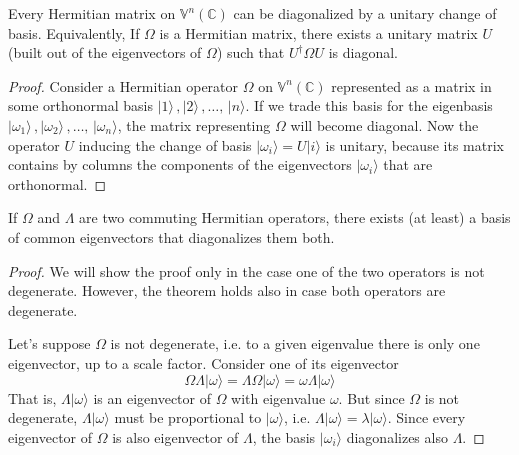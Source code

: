 \documentclass[11pt,fleqn]{book} %
\newcommand{\ket}[1]{| #1\rangle}
\begin{document}
\begin{theorem}
    Every Hermitian matrix on $\mathbb{V}^n(\mathbb{C})$ can be diagonalized by a unitary change of basis. Equivalently,
    If $\Omega$ is a Hermitian matrix, there exists a unitary matrix $U$ (built out of the eigenvectors of $\Omega$) such that 
    $U^\dagger\Omega U$ is diagonal.
\end{theorem}
\begin{proof}
    Consider a Hermitian operator $\Omega$ on $\mathbb{V}^n(\mathbb{C})$ represented as a matrix in some
    orthonormal basis $\ket{1}\,,\ket{2}\,,\dots,\,\ket{n}$. If we trade this basis for the eigenbasis
    $\ket{\omega_1}\,,\ket{\omega_2}\,,\dots,\,\ket{\omega_n}$, the matrix representing $\Omega$ will become diagonal. 
    Now the operator $U$ inducing the change of basis $\ket{\omega_i}=U\ket{i}$ is unitary, because its matrix contains by
    columns the components of the eigenvectors $\ket{\omega_i}$ that are orthonormal.
\end{proof}
\begin{theorem}
    If $\Omega$ and $\Lambda$ are two commuting Hermitian operators, there exists (at least) a basis of common eigenvectors that 
    diagonalizes them both.
\end{theorem}
\begin{proof}
    We will show the proof only in the case one of the two operators is not degenerate. However, the theorem holds also in case both 
    operators are degenerate.

    Let's suppose $\Omega$ is not degenerate, i.e. to a given eigenvalue there is only one eigenvector, up to a scale factor. Consider
    one of its eigenvector
    \begin{equation*}
        \Omega\Lambda\ket{\omega}=\Lambda\Omega\ket{\omega}=\omega\Lambda\ket{\omega}
    \end{equation*}
    That is, $\Lambda\ket{\omega}$ is an eigenvector of $\Omega$ with eigenvalue $\omega$. But since $\Omega$ is not degenerate,
     $\Lambda\ket{\omega}$ must be proportional to $\ket{\omega}$, i.e. $\Lambda\ket{\omega}=\lambda\ket{\omega}$.
     Since every eigenvector of $\Omega$ is also eigenvector of $\Lambda$, the basis $\ket{\omega_i}$ diagonalizes also $\Lambda$.
\end{proof}
\end{document}
